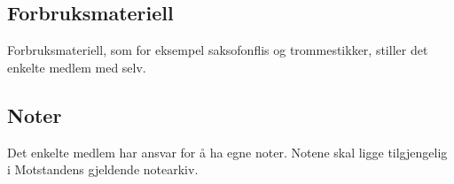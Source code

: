     \subsection{Forbruksmateriell}
        \begin{statute}
            Forbruksmateriell, som for eksempel saksofonflis og trommestikker, stiller det enkelte medlem med selv.
        \end{statute}
        
    \subsection{Noter}
        \begin{statute}
            Det enkelte medlem har ansvar for å ha egne noter. Notene skal ligge tilgjengelig i Motstandens gjeldende notearkiv.
        \end{statute}
     